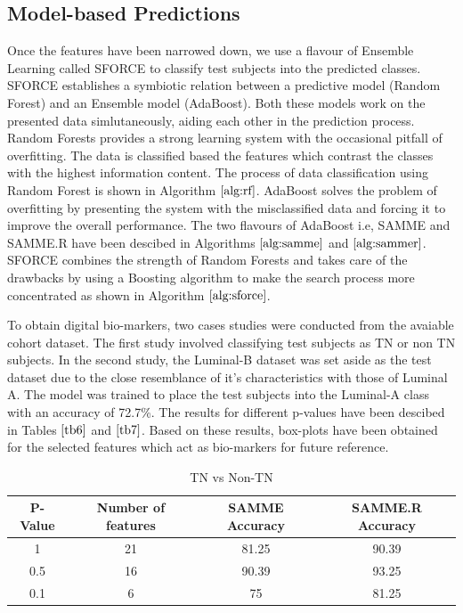 \documentclass[10pt,journal,compsoc]{IEEEtran}
\begin{document}
\subsection{Model-based Predictions}

Once the features have been narrowed down, we use a flavour of Ensemble Learning called SFORCE to classify test subjects into the predicted classes. SFORCE establishes a symbiotic relation between a predictive model (Random Forest) and an Ensemble model (AdaBoost). Both these models work on the presented data simlutaneously, aiding each other in the prediction process. Random Forests provides a strong learning system with the occasional pitfall of overfitting. The data is classified based the features which contrast the classes with the highest information content. The process of data classification using Random Forest is shown in Algorithm $\ref{alg:rf}$. AdaBoost solves the problem of overfitting by presenting the system with the misclassified data and forcing it to improve the overall performance. The two flavours of AdaBoost i.e, SAMME and SAMME.R have been descibed in Algorithms $\ref{alg:samme}$ and $\ref{alg:sammer}$. SFORCE combines the strength of Random Forests and takes care of the  drawbacks by using a Boosting algorithm to make the search process more concentrated as shown in Algorithm $\ref{alg:sforce}$. 

To obtain digital bio-markers, two cases studies were conducted from the avaiable cohort dataset. The first study involved classifying test subjects as TN or non TN subjects. In the second study, the Luminal-B dataset was set aside as the test dataset due to the close resemblance of it's characteristics with those of Luminal A. The model was trained to place the test subjects into the Luminal-A class with an accuracy of 72.7\%. The results for different p-values have been descibed in Tables $\ref{tb6}$ and $\ref{tb7}$. Based on these results,  box-plots have been obtained for the selected features which act as bio-markers for future reference.


\begin{table}[!b]
\centering
\caption{TN vs Non-TN}
\label{tb6}
\begin{tabular}{| c | c | c | c |}
\hline
P-Value & Number of features & SAMME Accuracy & SAMME.R Accuracy\\
\hline
1&21&81.25&90.39\\
\hline
0.5&16&90.39&93.25\\
\hline
0.1&6&75&81.25\\
\hline
\end{tabular}
\end{table}
\end{document}
